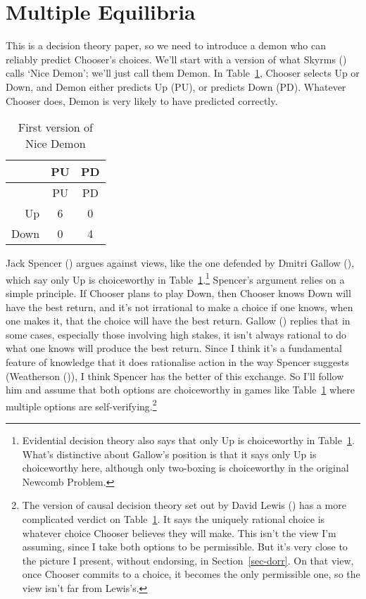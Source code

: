 \documentclass[
  11pt,
  letterpaper,
  DIV=11,
  numbers=noendperiod,
  twoside]{scrartcl}
\begin{document}
\section{Multiple Equilibria}\label{sec-multieq}

This is a decision theory paper, so we need to introduce a demon who can
reliably predict Chooser's choices. We'll start with a version of what
Skyrms () calls `Nice Demon'; we'll just
call them Demon. In Table~\ref{tbl-nice-demon}, Chooser selects Up or
Down, and Demon either predicts Up (PU), or predicts Down (PD). Whatever
Chooser does, Demon is very likely to have predicted correctly.

\begin{longtable}[]{@{}rcc@{}}
\caption{First version of Nice
Demon}\label{tbl-nice-demon}\tabularnewline
\toprule\noalign{}
& PU & PD \\
\midrule\noalign{}
\endfirsthead
\toprule\noalign{}
& PU & PD \\
\midrule\noalign{}
\endhead
\bottomrule\noalign{}
\endlastfoot
Up & 6 & 0 \\
Down & 0 & 4 \\
\end{longtable}

Jack Spencer () argues against views,
like the one defended by Dmitri Gallow
(), which say only Up is choiceworthy in
Table~\ref{tbl-nice-demon}.\footnote{Evidential decision theory also
  says that only Up is choiceworthy in Table~\ref{tbl-nice-demon}.
  What's distinctive about Gallow's position is that it says only Up is
  choiceworthy here, although only two-boxing is choiceworthy in the
  original Newcomb Problem.} Spencer's argument relies on a simple
principle. If Chooser plans to play Down, then Chooser knows Down will
have the best return, and it's not irrational to make a choice if one
knows, when one makes it, that the choice will have the best return.
Gallow () replies that in some cases,
especially those involving high stakes, it isn't always rational to do
what one knows will produce the best return. Since I think it's a
fundamental feature of knowledge that it does rationalise action in the
way Spencer suggests (Weatherson
()), I think Spencer has the better
of this exchange. So I'll follow him and assume that both options are
choiceworthy in games like Table~\ref{tbl-nice-demon} where multiple
options are self-verifying.\footnote{The version of causal decision
  theory set out by David Lewis () has a
  more complicated verdict on Table~\ref{tbl-nice-demon}. It says the
  uniquely rational choice is whatever choice Chooser believes they will
  make. This isn't the view I'm assuming, since I take both options to
  be permissible. But it's very close to the picture I present, without
  endorsing, in Section~\ref{sec-dorr}. On that view, once Chooser
  commits to a choice, it becomes the only permissible one, so the view
  isn't far from Lewis's.}
\end{document}

